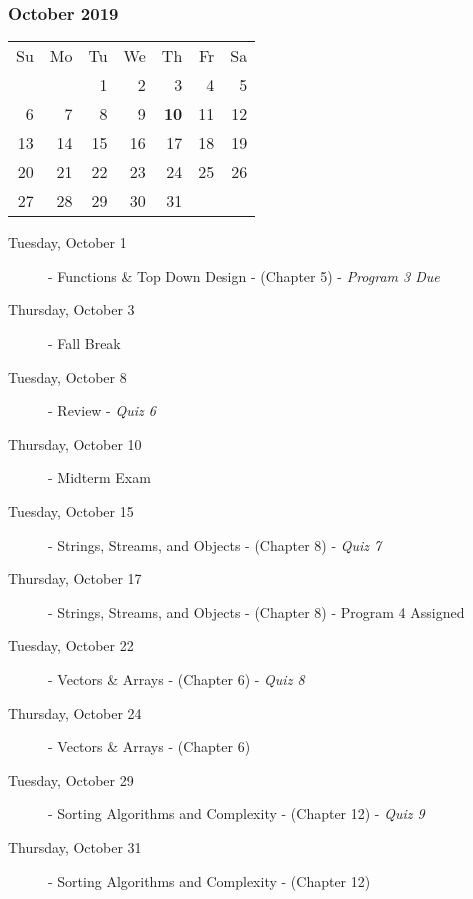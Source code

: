 \subsubsection*{October 2019}
\begin{tabular}{rrrrrrr}
Su & Mo & Tu & We & Th & Fr & Sa\\
   &    &  1 &  2 &  3 &  4 &  5\\
 6 &  7 &  8 &  9 & {\bf 10} & 11 & 12\\
13 & 14 & 15 & 16 & 17 & 18 & 19\\ 
20 & 21 & 22 & 23 & 24 & 25 & 26\\ 
27 & 28 & 29 & 30 & 31 &    &   \\
\end{tabular}
\begin{description}
\item[Tuesday, October 1]
  - Functions \& Top Down Design
  \newline- (Chapter 5)
  \newline- {\em Program 3 Due}
\item[Thursday, October 3] - Fall Break

\item[Tuesday, October 8] 
  - Review
  \newline- {\em Quiz 6}
\item[Thursday, October 10]
  - Midterm Exam

\item[Tuesday, October 15]
  - Strings, Streams, and Objects
  \newline- (Chapter 8)
  \newline- {\em Quiz 7}
\item[Thursday, October 17]
  - Strings, Streams, and Objects
  \newline- (Chapter 8)
  \newline- Program 4 Assigned

\item[Tuesday, October 22]
  - Vectors \& Arrays
  \newline- (Chapter 6)
  \newline- {\em Quiz 8}
\item[Thursday, October 24]
  - Vectors \& Arrays
  \newline- (Chapter 6)

\item[Tuesday, October 29]
  - Sorting Algorithms and Complexity
  \newline- (Chapter 12)
  \newline- {\em Quiz 9}
\item[Thursday, October 31]
  - Sorting Algorithms and Complexity
  \newline- (Chapter 12)

\end{description}


